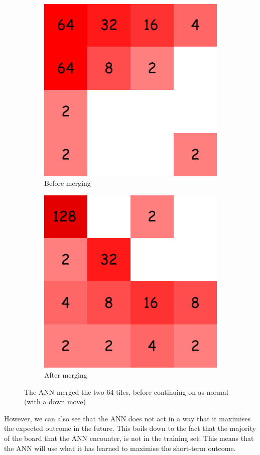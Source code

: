 \documentclass{article}
\begin{document}
\begin{figure}[H]
\centering
\begin{subfigure}{.6\textwidth}
  \centering
  \includegraphics[width=.6\linewidth]{images/merge-before.png}
  \caption{Before merging}
  \label{fig:sub1}
\end{subfigure}%
\begin{subfigure}{.6\textwidth}
  \centering
  \includegraphics[width=.6\linewidth]{images/merge-after.png}
  \caption{After merging}
  \label{fig:sub2}
\end{subfigure}
\caption{The ANN merged the two 64-tiles, before continuing on as normal (with a down move)}
\label{fig:merging}
\end{figure}

However, we can also see that the ANN does not act in a way that it maximises the expected outcome in the future. This boils down to the fact that the majority of the board that the ANN encounter, is not in the training set. This means that the ANN will use what it has learned to maximise the short-term outcome.
\end{document}
